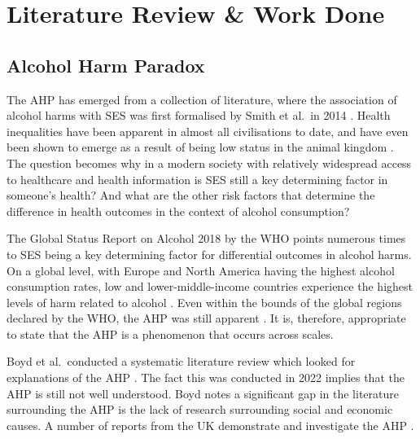 \chapter{Literature Review \& Work Done}


\section{Alcohol Harm Paradox}

The \ac{AHP} has emerged from a collection of literature, where the association of alcohol harms with \ac{SES} was first formalised by Smith et al.~in 2014 \cite{ahpOrigin}. Health inequalities have been apparent in almost all civilisations to date, and have even been shown to emerge as a result of being low status in the animal kingdom \cite{primateSocialDeterminants, Krieger1997}. The question becomes why in a modern society with relatively widespread access to healthcare and health information is \ac{SES} still a key determining factor in someone's health? And what are the other risk factors that determine the  difference in health outcomes in the context of alcohol consumption?

The Global Status Report on Alcohol 2018 by the \ac{WHO} points numerous times to \ac{SES} being a key determining factor for  differential outcomes in alcohol harms. On a global level, with Europe and North America having the highest alcohol consumption rates, low and lower-middle-income countries experience the highest levels of harm related to alcohol \cite{WHOGlobalStatusReportFull}. Even within the bounds of the global regions declared by the \ac{WHO}, the \ac{AHP} was still apparent \cite{WHOGlobalStatusReportFull}. It is, therefore, appropriate to state that the \ac{AHP} is a phenomenon that occurs across scales. 

Boyd et al.~conducted a systematic literature review which looked for explanations of the \ac{AHP} \cite{Boyd2022}. The fact this was conducted in 2022 implies that the \ac{AHP} is still not well understood. Boyd notes a significant gap in the literature surrounding the \ac{AHP} is the lack of research surrounding social and economic causes. A number of reports from the UK demonstrate and investigate the \ac{AHP} \cite{scotlandAlcohol2022, ahpInterventions, ahp2016, ahpWhatNext}. 


